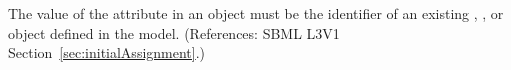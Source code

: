 The value of the attribute  in an \InitialAssignment object
must be the identifier of an existing \Compartment, \Species,
\Parameter or \SpeciesReference object defined in the model.  (References:
SBML L3V1 Section~\ref{sec:initialAssignment}.)
